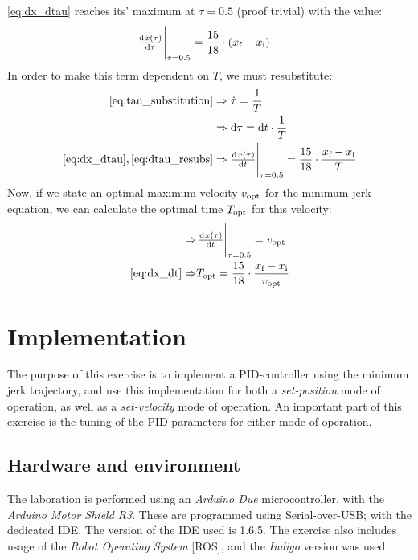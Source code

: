 \documentclass[11pt]{article}
\begin{document}
\ref{eq:dx_dtau} reaches its' maximum at $\tau=0.5$ (proof trivial) with the value:
\begin{align}
  \eval{\od{x(\tau)}{\tau}}_{\tau=0.5}&=\frac{15}{18}\cdot(\di{x}{f} - \di{x}{i})
\end{align}
In order to make this term dependent on $T$, we must resubstitute:
\begin{align}
  \ref{eq:tau_substitution}&\Rightarrow %
\dot{\tau}
=\frac{1}{T}\\
  &\Rightarrow\dif\tau=\dif t\cdot\frac{1}{T}\label{eq:dtau_resubs}\\
  \ref{eq:dx_dtau},\ref{eq:dtau_resubs}&\Rightarrow%
\eval{\od{x(\tau)}{t}}
_{\tau=0.5}=\frac{15}{18}\cdot\frac{\di{x}{f} - \di{x}{i}}{T}\label{eq:dx_dt}
\end{align}
Now, if we state an optimal maximum velocity $v_\textup{opt}$ for the minimum jerk equation, we can calculate the optimal time $T_\textup{opt}$ for this velocity:
\begin{align}
  \Rightarrow&\eval{\od{x(\tau)}{t}}_{\tau=0.5}=\di{v}{opt}\\
  \ref{eq:dx_dt}\Rightarrow& \di{T}{opt}=\frac{15}{18}\cdot\frac{\di{x}{f} - \di{x}{i}}{\di{v}{opt}}
\end{align}
\par

\section{Implementation}
The purpose of this exercise is to implement a PID-controller using the minimum jerk trajectory, and use this implementation for both a \emph{set-position} mode of operation, as well as a \emph{set-velocity} mode of operation. An important part of this exercise is the tuning of the PID-parameters for either mode of operation. \par

\subsection{Hardware and environment}
The laboration is performed using an \emph{Arduino Due} microcontroller, with the \emph{Arduino Motor Shield R3}. These are programmed using Serial-over-USB; with the dedicated IDE. The version of the IDE used is 1.6.5. The exercise also includes usage of the \emph{Robot Operating System} [ROS], and the \emph{Indigo} version was used. \par
\end{document}
